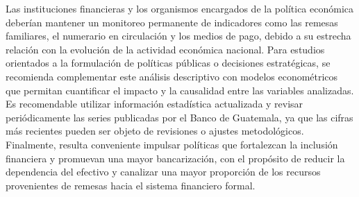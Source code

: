 Las instituciones financieras y los organismos encargados de la política económica deberían mantener un monitoreo permanente de indicadores como las remesas familiares, el numerario en circulación y los medios de pago, debido a su estrecha relación con la evolución de la actividad económica nacional.
Para estudios orientados a la formulación de políticas públicas o decisiones estratégicas, se recomienda complementar este análisis descriptivo con modelos econométricos que permitan cuantificar el impacto y la causalidad entre las variables analizadas.
Es recomendable utilizar información estadística actualizada y revisar periódicamente las series publicadas por el Banco de Guatemala, ya que las cifras más recientes pueden ser objeto de revisiones o ajustes metodológicos.
Finalmente, resulta conveniente impulsar políticas que fortalezcan la inclusión financiera y promuevan una mayor bancarización, con el propósito de reducir la dependencia del efectivo y canalizar una mayor proporción de los recursos provenientes de remesas hacia el sistema financiero formal.